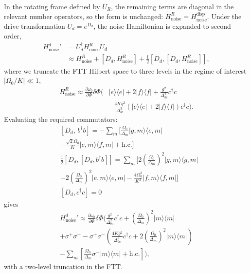 In the rotating frame defined by $U_R$, the remaining terms are diagonal in the relevant number operators, so the form is unchanged: $H_{\text{noise}}^R = H_{\text{noise}}^{\text{disp}}$.
Under the drive transformation $U_d = e^{D_d}$, the noise Hamiltonian is expanded to second order,
\begin{align}
    {H_{\text{noise}}^d}' &= U_d^\dagger H_{\text{noise}}^R U_d \nonumber \\
    &\approx H_{\text{noise}}^R + [D_d, H_{\text{noise}}^R] + \frac{1}{2} [D_d, [D_d, H_{\text{noise}}^R]] \nonumber ,
\end{align}
where we truncate the FTT Hilbert space to three levels in the regime of interest $|\Omega_0/K|\ll1$,
\begin{equation}
\begin{split}
    H_{\text{noise}}^R \approx \frac{\partial \omega_b}{\partial \Phi} \delta \Phi \bigg( & |e\rangle\langle e| + 2|f\rangle\langle f| + \frac{g^2}{\Delta^2_{bc}} c^\dagger c \\
    & - \frac{4Kg^2}{\Delta_{bc}^3} \left( |e\rangle\langle e| + 2|f\rangle\langle f| \right) c^\dagger c \bigg).
\end{split}
\end{equation}
Evaluating the required commutators:
\begin{align}
    &\left[ D_d, \, b^\dagger b\right] = -\sum_m \big[ \frac{\Omega_0}{\Delta_m} |g,m\rangle \langle e,m| \nonumber \\
    &+ \frac{\sqrt{2}\Omega_0}{K} |e,m\rangle \langle f,m| + \text{h.c.} \big] \nonumber\\
    &\frac{1}{2} \left[ D_d, \left[ D_d, b^\dagger b \right] \right]= \sum_m \Bigg[ 2 \left( \frac{\Omega_0}{\Delta_m} \right)^2 |g,m\rangle\langle g,m| \nonumber \\
    &- 2 \left( \frac{\Omega_0}{\Delta_m} \right)^2 |e,m\rangle\langle e,m|   - \frac{4\Omega_0^2}{K^2} |f,m\rangle\langle f,m| \Bigg]\nonumber \\
    &[D_d,c^\dagger c] = 0
\end{align}
gives
\begin{multline}
\label{noise Hamiltoniand}
    {H_{\text{noise}}^d}' \approx \frac{\partial \omega_b}{\partial \Phi} \delta \Phi \Bigg(  \frac{g^2}{\Delta_{bc}^2} c^\dagger c + \left(\frac{\Omega_0}{\Delta_m}\right)^2 |m\rangle\langle m| \\
    +\sigma^+ \sigma^-- \sigma^+ \sigma^- \left( \frac{4Kg^2}{\Delta_{bc}^3} c^\dagger c + 2\left(\frac{\Omega_0}{\Delta_m}\right)^2 |m\rangle\langle m| \right) \\
    - \sum_m \left[ \frac{\Omega_0}{\Delta_m} \sigma^- |m\rangle\langle m| + \text{h.c.} \right]\Bigg),
\end{multline}
with a two-level truncation in the FTT.

